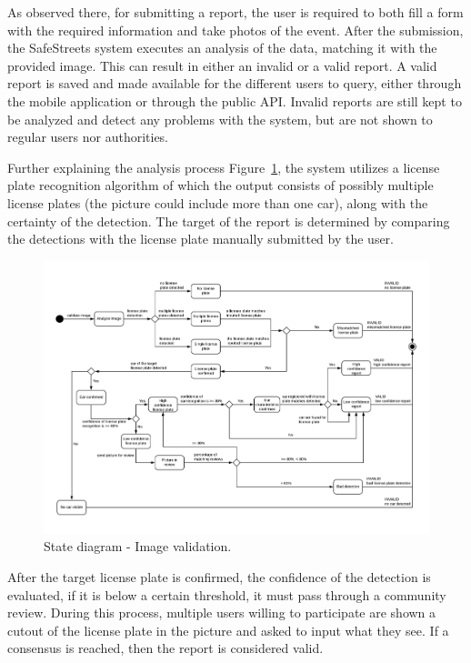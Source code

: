 As observed there, for submitting a report, the user is required to both fill a form with the required information and take photos of the event. After the submission, the SafeStreets system executes an analysis of the data, matching it with the provided image. This can result in either an invalid or a valid report. A valid report is saved and made available for the different users to query, either through the mobile application or through the public API. Invalid reports are still kept to be analyzed and detect any problems with the system, but are not shown to regular users nor authorities.

Further explaining the analysis process Figure~\ref{fig:state-report-validation}, the system utilizes a license plate recognition algorithm of which the output consists of possibly multiple license plates (the picture could include more than one car), along with the certainty of the detection.
The target of the report is determined by comparing the detections with the license plate manually submitted by the user.

\begin{figure}[!h]
\centering
\includegraphics[angle=-90,origin=c,width=\textwidth]{Images/state-image-validation.png}
\caption{\label{fig:state-report-validation}State diagram - Image validation.}
\end{figure}

After the target license plate is confirmed, the confidence of the detection is evaluated, if it is below a certain threshold, it must pass through a community review. During this process, multiple users willing to participate are shown a cutout of the license plate in the picture and asked to input what they see. If a consensus is reached, then the report is considered valid.

